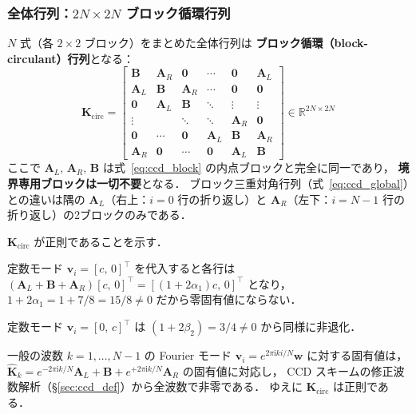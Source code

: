 \subsubsection{全体行列：\texorpdfstring{$2N\times 2N$}{2N x 2N} ブロック循環行列}

$N$ 式（各 $2\times 2$ ブロック）をまとめた全体行列は
\textbf{ブロック循環（block-circulant）行列}となる：
%
\begin{equation}
  \mathbf{K}_{\mathrm{circ}} =
  \begin{bmatrix}
    \mathbf{B}   & \mathbf{A}_R & \mathbf{0}   & \cdots & \mathbf{0}   & \mathbf{A}_L \\
    \mathbf{A}_L & \mathbf{B}   & \mathbf{A}_R & \cdots & \mathbf{0}   & \mathbf{0}   \\
    \mathbf{0}   & \mathbf{A}_L & \mathbf{B}   & \ddots & \vdots       & \vdots       \\
    \vdots       &              & \ddots        & \ddots & \mathbf{A}_R & \mathbf{0}   \\
    \mathbf{0}   & \cdots       & \mathbf{0}   & \mathbf{A}_L & \mathbf{B} & \mathbf{A}_R \\
    \mathbf{A}_R & \mathbf{0}   & \cdots & \mathbf{0}   & \mathbf{A}_L & \mathbf{B}
  \end{bmatrix}
  \in \mathbb{R}^{2N\times 2N}
  \label{eq:ccd_circulant}
\end{equation}
%
ここで $\mathbf{A}_L,\, \mathbf{A}_R,\, \mathbf{B}$ は式~\eqref{eq:ccd_block} の内点ブロックと完全に同一であり，
\textbf{境界専用ブロックは一切不要}となる．
ブロック三重対角行列（式~\eqref{eq:ccd_global}）との違いは隅の $\mathbf{A}_L$（右上：$i=0$ 行の折り返し）と $\mathbf{A}_R$（左下：$i=N{-}1$ 行の折り返し）の2ブロックのみである．

\begin{tcolorbox}[defbox, title={ブロック循環行列の正則性}]
$\mathbf{K}_{\mathrm{circ}}$ が正則であることを示す．

定数モード $\bm{v}_i = [c,\, 0]^\top$ を代入すると各行は
$(\mathbf{A}_L + \mathbf{B} + \mathbf{A}_R)[c,\, 0]^\top = [(1+2\alpha_1)c,\, 0]^\top$ となり，
$1+2\alpha_1 = 1 + 7/8 = 15/8 \neq 0$ だから零固有値にならない．

定数モード $\bm{v}_i = [0,\, c]^\top$ は $(1+2\beta_2) = 3/4 \neq 0$ から同様に非退化．

一般の波数 $k=1,\ldots,N-1$ の Fourier モード $\bm{v}_i = e^{2\pi\mathrm{i}ki/N}\bm{w}$ に対する固有値は，
$\hat{\mathbf{K}}_k = e^{-2\pi\mathrm{i}k/N}\mathbf{A}_L + \mathbf{B} + e^{+2\pi\mathrm{i}k/N}\mathbf{A}_R$ の固有値に対応し，
CCD スキームの修正波数解析（§\ref{sec:ccd_def}）から全波数で非零である．
ゆえに $\mathbf{K}_{\mathrm{circ}}$ は正則である．
\end{tcolorbox}

